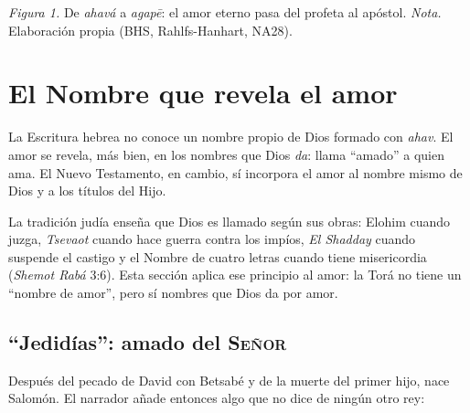 \documentclass[11pt,letterpaper]{article}
\newcommand{\heb}[1]{\mbox{\foreignlanguage{hebrew}{#1}}}
\newcommand{\grc}[1]{\foreignlanguage{ancientgreek}{#1}}
\newcommand{\SENOR}{\textsc{Señor}}
\begin{document}
\begin{center}
\par
{\footnotesize\color{gris}\textit{Figura 1.} De \emph{ahavá} a \emph{agapē}: el amor eterno pasa del profeta al apóstol. \textit{Nota.} Elaboración propia (BHS, Rahlfs-Hanhart, NA28).}
\end{center}

\section{El Nombre que revela el amor}\label{sec:nombre-amor}

La Escritura hebrea no conoce un nombre propio de Dios formado con \emph{ahav}. El amor se revela, más bien, en los nombres que Dios \emph{da}: llama ``amado'' a quien ama. El Nuevo Testamento, en cambio, sí incorpora el amor al nombre mismo de Dios y a los títulos del Hijo.

\begin{nota}[Precisión]
La tradición judía enseña que Dios es llamado según sus obras: Elohim cuando juzga, \emph{Tsevaot} cuando hace guerra contra los impíos, \emph{El Shadday} cuando suspende el castigo y el Nombre de cuatro letras cuando tiene misericordia (\emph{Shemot Rabá} 3:6). Esta sección aplica ese principio al amor: la Torá no tiene un ``nombre de amor'', pero sí nombres que Dios da por amor.
\end{nota}

\subsection{``Jedidías'': amado del \SENOR}
Después del pecado de David con Betsabé y de la muerte del primer hijo, nace Salomón. El narrador añade entonces algo que no dice de ningún otro rey:
\end{document}

